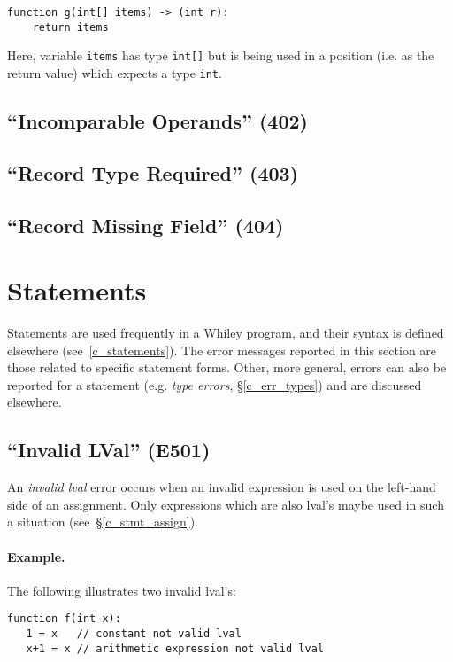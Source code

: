 \begin{lstlisting}
function g(int[] items) -> (int r):
    return items
\end{lstlisting}

Here, variable \lstinline{items} has type \lstinline{int[]} but is being used in a position (i.e. as the return value) which expects a type \lstinline{int}.

\subsection{``Incomparable Operands'' (402)}

\subsection{``Record Type Required'' (403)}

\subsection{``Record Missing Field'' (404)}


\section{Statements}

Statements are used frequently in a Whiley program, and their syntax is defined elsewhere (see~\ref{c_statements}).  The error messages reported in this section are those related to specific statement forms.  Other, more general, errors can also be reported for a statement (e.g. {\em type errors}, \S\ref{c_err_types}) and are discussed elsewhere.

\subsection{``Invalid LVal'' (E501)}

An {\em invalid lval} error occurs when an invalid expression is used on the left-hand side of an assignment.  Only expressions which are also lval's maybe used in such a situation  (see~\S\ref{c_stmt_assign}).

\paragraph{Example.}  The following illustrates two invalid lval's:

\begin{lstlisting}
function f(int x):
   1 = x   // constant not valid lval
   x+1 = x // arithmetic expression not valid lval\end{lstlisting}

